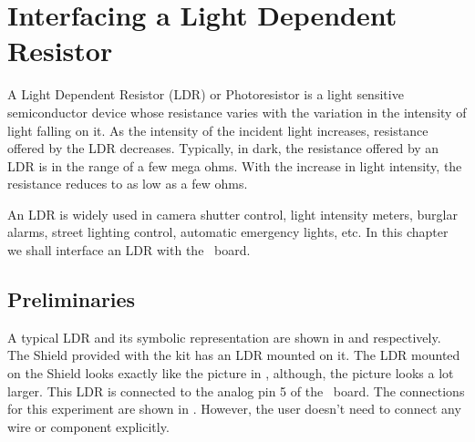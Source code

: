 \chapter {Interfacing a Light Dependent Resistor}
\thispagestyle{empty}
\label{ldr}

\newcommand{\LocLDRfig}{\Origin/user-code/ldr/figures}
\newcommand{\LocLDRscicode}{\Origin/user-code/ldr/scilab}
\newcommand{\LocLDRscibrief}[1]{{\tt
      \seqsplit{Origin/user-code/ldr/scilab/#1}},
  see \fnrefp{fn:file-loc}}
\newcommand{\LocLDRardcode}{\Origin/user-code/ldr/arduino}
\newcommand{\LocLDRardbrief}[1]{{\tt
      \seqsplit{Origin/user-code/ldr/arduino/#1}},
  see \fnrefp{fn:file-loc}}

\newcommand{\LocLDRpycode}{\Origin/user-code/ldr/python}
\newcommand{\LocLDRpybrief}[1]{{\tt \seqsplit{%
        Origin/user-code/ldr/python/#1}}, see \fnrefp{fn:file-loc}}

\newcommand{\LocLDRjuliacode}{\Origin/user-code/ldr/julia}
\newcommand{\LocLDRjuliabrief}[1]{{\tt \seqsplit{%
        Origin/user-code/ldr/julia/#1}}, see \fnrefp{fn:file-loc}}

\newcommand{\LocLDROpenModelicacode}{\Origin/user-code/ldr/OpenModelica}  %
\newcommand{\LocLDROpenModelicabrief}[1]{{\tt \seqsplit{%
        Origin/user-code/led/OpenModelica/#1}}, see \fnrefp{fn:file-loc}} %



A Light Dependent Resistor (LDR) or Photoresistor is a light sensitive
semiconductor device whose resistance varies with the variation in the
intensity of light falling on it. As the intensity of the incident
light increases, resistance offered by the LDR decreases. Typically,
in dark, the resistance offered by an LDR is in the range of a few
mega ohms. With the increase in light intensity, the resistance
reduces to as low as a few ohms.   

An LDR is widely used in camera shutter control, light intensity
meters, burglar alarms, street lighting control, automatic emergency
lights, etc. In this chapter we shall interface an LDR with the
\arduino\ board.  

\section{Preliminaries}
A typical LDR and its symbolic representation are shown in
 and  respectively. The Shield
provided with the kit has an LDR mounted on it.  The LDR mounted on
the Shield looks exactly like the picture in ,
although, the picture looks a lot larger.  This LDR is connected
to the analog pin 5 of the \arduino\ board. The connections for this
experiment are shown in . However, the user
doesn't need to connect any wire or component explicitly.

